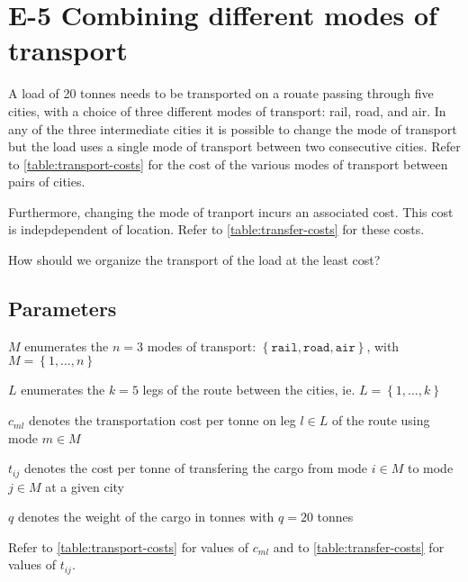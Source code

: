 \chapter{E-5 Combining different modes of transport}

A load of 20 tonnes needs to be transported on a rouate passing through five cities,
with a choice of three different modes of transport: rail, road, and air. In any
of the three intermediate cities it is possible to change the mode of transport
but the load uses a single mode of transport between two consecutive cities.
Refer to \cref{table:transport-costs} for the cost of the various modes of
transport between pairs of cities.

Furthermore, changing the mode of tranport incurs an associated cost. This cost
is indepdependent of location. Refer to \cref{table:transfer-costs} for these
costs.

How should we organize the transport of the load at the least cost?

\section{Parameters}

\begin{syms}

\item[$M$] enumerates the $n=3$ modes of transport:
    $\left\lbrace \texttt{rail}, \texttt{road}, \texttt{air}\right\rbrace$,
    with $M=\left\lbrace 1, \ldots, n\right\rbrace$

\item[$L$] enumerates the $k=5$ legs of the route between the cities, ie.
    $L=\left\lbrace 1,\ldots, k\right\rbrace$

\item[$c_{ml}$] denotes the transportation cost per tonne on leg $l\in L$ of the route
    using mode $m\in M$

\item[$t_{ij}$] denotes the cost per tonne of transfering the cargo from mode $i\in M$ to mode
    $j\in M$ at a given city

\item[$q$] denotes the weight of the cargo in tonnes with $q=20$ tonnes

\end{syms}

Refer to \cref{table:transport-costs} for values of $c_{ml}$ and to \cref{table:transfer-costs}
for values of $t_{ij}$.

